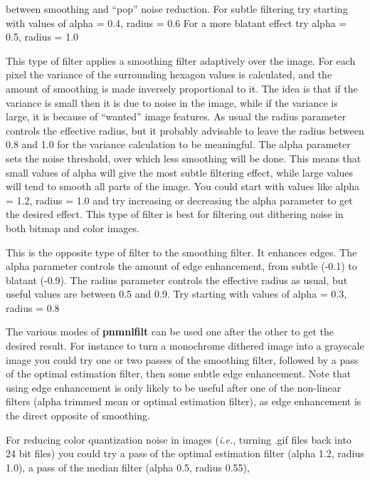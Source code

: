 between smoothing and ``pop'' noise reduction. For subtle filtering
try starting with values of alpha = 0.4, radius = 0.6  For a more blatant
effect try alpha = 0.5, radius = 1.0
\par
This type of filter applies a smoothing filter adaptively over the image.
For each pixel the variance of the surrounding hexagon values is calculated,
and the amount of smoothing is made inversely proportional to it. The idea
is that if the variance is small then it is due to noise in the image, while
if the variance is large, it is because of ``wanted'' image features. As usual
the radius parameter controls the effective radius, but it probably advisable to
leave the radius between 0.8 and 1.0 for the variance calculation to be meaningful.
The alpha parameter sets the noise threshold, over which less smoothing will be done.
This means that small values of alpha will give the most subtle filtering effect,
while large values will tend to smooth all parts of the image. You could start
with values like alpha = 1.2, radius = 1.0 and try increasing or decreasing the
alpha parameter to get the desired effect. This type of filter is best for
filtering out dithering noise in both bitmap and color images.
\par
This is the opposite type of filter to the smoothing filter. It enhances
edges. The alpha parameter controls the amount of edge enhancement, from
subtle (-0.1) to blatant (-0.9). The radius parameter controls the effective
radius as usual, but useful values are between 0.5 and 0.9. Try starting
with values of alpha = 0.3, radius = 0.8
\par
The various modes of 
{\bf pnmnlfilt}
can be used one after the other to get the desired result. For instance to
turn a monochrome dithered image into a grayscale image you could try
one or two passes of the smoothing filter, followed by a pass of the optimal estimation
filter, then some subtle edge enhancement. Note that using edge enhancement is
only likely to be useful after one of the non-linear filters (alpha trimmed mean
or optimal estimation filter), as edge enhancement is the direct opposite of
smoothing.
\par
For reducing color quantization noise in images ({\it i.e.}, turning .gif files back into
24 bit files) you could try a pass of the optimal estimation filter
(alpha 1.2, radius 1.0), a pass of the median filter (alpha 0.5, radius 0.55),
